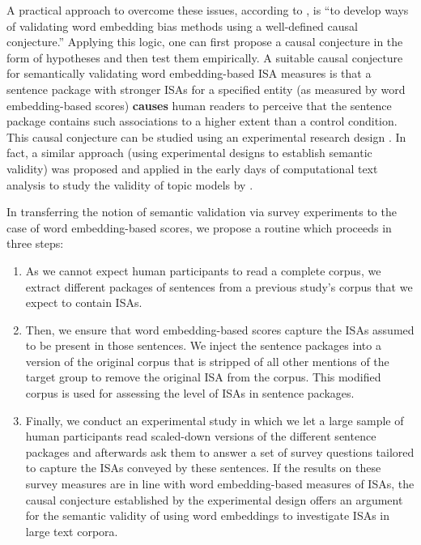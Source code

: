 A practical approach to overcome these issues, according to \textcite[][p.409]{mueller:2023:DRN}, is ``to develop ways of validating word embedding bias methods using a well-defined causal conjecture.'' Applying this logic, one can first propose a causal conjecture in the form of hypotheses and then test them empirically. A suitable causal conjecture for semantically validating word embedding-based ISA measures is that a sentence package with stronger ISAs for a specified entity (as measured by word embedding-based scores) \textbf{causes} human readers to perceive that the sentence package contains such associations to a higher extent than a control condition. This causal conjecture can be studied using an experimental research design \parencite{imai2011}. In fact, a similar approach (using experimental designs to establish semantic validity) was proposed and applied in the early days of computational text analysis to study the validity of topic models by \textcite{Grimmer2013,grimmer:2011:G}.

In transferring the notion of semantic validation via survey experiments to the case of word embedding-based scores, we propose a routine which proceeds in three steps: 
\begin{enumerate}
    \item As we cannot expect human participants to read a complete corpus, we extract different packages of sentences from a previous study's corpus \parencite{mueller:2023:DRN} that we expect to contain ISAs.
    \item Then, we ensure that word embedding-based scores capture the ISAs assumed to be present in those sentences. We inject the sentence packages into a version of the original corpus that is stripped of all other mentions of the target group to remove the original ISA from the corpus. This modified corpus is used for assessing the level of ISAs in sentence packages.
    \item  Finally, we conduct an experimental study in which we let a large sample of human participants read scaled-down versions of the different sentence packages and afterwards ask them to answer a set of survey questions tailored to capture the ISAs conveyed by these sentences. If the results on these survey measures are in line with word embedding-based measures of ISAs, the causal conjecture established by the experimental design offers an argument for the semantic validity of using word embeddings to investigate ISAs in large text corpora.
\end{enumerate}

